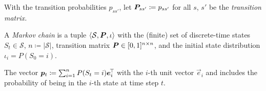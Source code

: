 		\begin{definition}
			With the transition probabilities \(p_{ss'}\), let \( \bm{P}_{ss'} \coloneqq p_{ss'} \) for all \(s\), \(s'\) be the \emph{transition matrix.}
		\end{definition}

		\begin{definition}
			A \emph{Markov chain} is a tuple \( \langle \mathcal{S}, \bm{P}, \iota \rangle \) with the (finite) set of discrete-time states \(S_t \in \mathcal{S}\), \( n \coloneqq \lvert \mathcal{S} \rvert \), transition matrix \( \bm{P} \in [0, 1]^{n \times n} \), and the initial state distribution \( \iota_i = P(S_0 = i) \).
		\end{definition}

		\begin{definition}  \label{def:probRowVector}
			The vector \( \bm{p}_t \coloneqq \sum_{i = 1}^{n} P(S_t = i) \bm{e}_i^{\!\top\!} \) with the \(i\)-th unit vector \(\vec{e}_i\) and includes the probability of being in the \(i\)-th state at time step \(t\).
		\end{definition}


